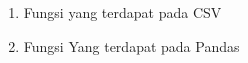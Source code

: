 \begin{enumerate}
\item
Fungsi yang terdapat pada CSV




\item
Fungsi Yang terdapat pada Pandas



\end{enumerate}
